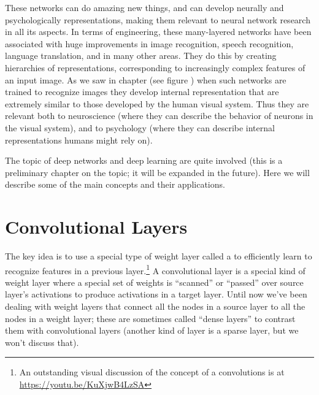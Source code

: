These networks can do amazing new things, and can develop neurally and psychologically representations, making them relevant to neural network research in all its aspects. In terms of engineering, these many-layered networks have been associated with huge improvements in image recognition, speech recognition, language translation, and in many other areas. They do this by creating hierarchies of representations, corresponding  to increasingly complex features of an input image. As we saw in chapter  (see figure ) when such networks are trained to recognize images they develop internal representation that are extremely similar to those developed by the human visual  system. Thus they are relevant both to neuroscience (where they can describe the behavior of neurons in the visual system), and to psychology (where they can describe internal representations humans might rely on).

The topic of deep networks and deep learning are quite involved (this is a preliminary chapter on the topic; it will be expanded in the future). Here we will describe some of the main concepts and their applications.

\section{Convolutional Layers}

The key idea is to use a special type of weight layer called a  to efficiently learn to recognize features in a previous layer.\footnote{An outstanding visual discussion of the concept of a convolutions is at \url{https://youtu.be/KuXjwB4LzSA}} A convolutional layer is a special kind of weight layer where a special set of weights is ``scanned'' or ``passed'' over source layer's activations to produce activations in a target layer. Until now we've been dealing with weight layers that connect all the nodes in a source layer to all the nodes in a weight layer; these are sometimes called ``dense layers'' to contrast them with convolutional layers (another kind of layer is a sparse layer, but we won't discuss that). 

